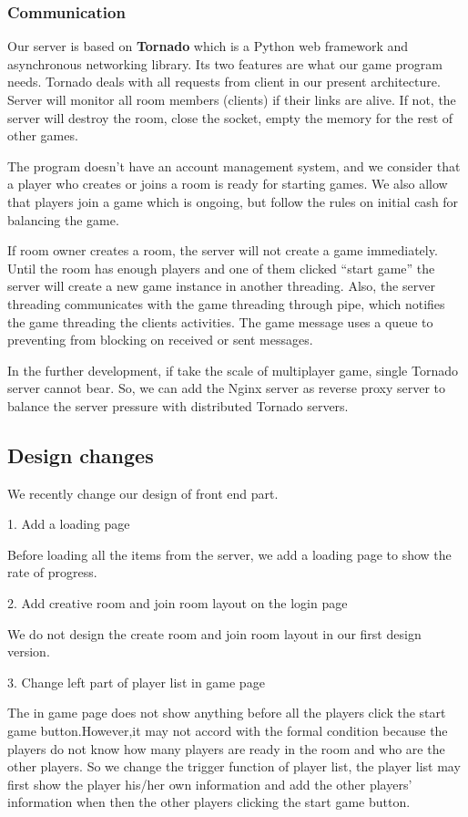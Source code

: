 \documentclass[a4paper,11pt]{article}
\begin{document}
\subsubsection{Communication}
Our server is based on \textbf{Tornado} which is a Python web framework and asynchronous networking library. Its two features are what our game program needs. Tornado deals with all requests from client in our present architecture. Server will monitor all room members (clients) if their links are alive. If not, the server will destroy the room, close the socket, empty the memory for the rest of other games. 

The program doesn't have an account management system, and we consider that a player who creates or joins a room is ready for starting games. We also allow that players join a game which is ongoing, but follow the rules on initial cash for balancing the game.

If room owner creates a room, the server will not create a game immediately. Until the room has enough players and one of them clicked “start game” the server will create a new game instance in another threading. Also, the server threading communicates with the game threading through pipe, which notifies the game threading the clients activities. The game message uses a queue to preventing from blocking on received or sent messages.

In the further development, if take the scale of multiplayer game, single Tornado server cannot bear. So, we can add the Nginx server as reverse proxy server to balance the server pressure with distributed Tornado servers.
\subsection{Design changes}
We recently change our design of front end part.

1.	Add a loading page

	Before loading all the items from the server, we add a loading page to show the rate of progress.

2.	Add creative room and join room layout on the login page

	We do not design the create room and join room layout in our first design version. 

3.	Change left part of player list in game page

	The in game page does not show anything before all the players click the start game button.However,it may not accord with the formal condition because the players do not know how many players are ready in the room and who are the other players. So we change the trigger function of player list, the player list may first show the player his/her own information and add the other players' information when then the other players clicking the start game button. 
\end{document}
